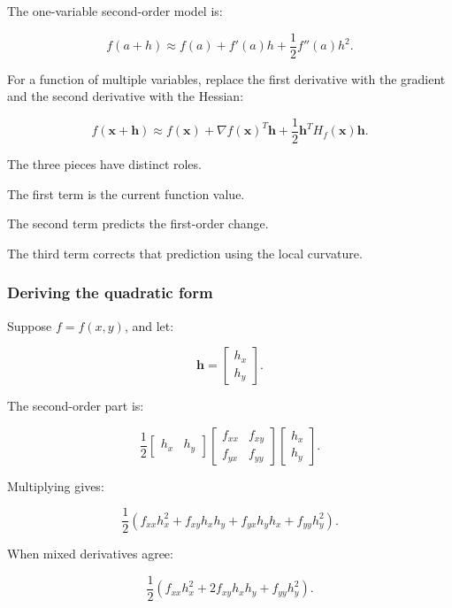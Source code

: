 \hypertarget{02-foundations-ii-ch021-multivariable-taylor-approximation}{}

The one-variable second-order model is:

\[
f(a+h) \approx f(a)+f'(a)h+\frac12f''(a)h^2.
\]

For a function of multiple variables, replace the first derivative with the gradient and the second derivative with the Hessian:

\[
\boxed{ f(\mathbf x+\mathbf h) \approx f(\mathbf x) + \nabla f(\mathbf x)^T\mathbf h + \frac12\mathbf h^TH_f(\mathbf x)\mathbf h }.
\]

The three pieces have distinct roles.

The first term is the current function value.

The second term predicts the first-order change.

The third term corrects that prediction using the local curvature.

\subsubsection{Deriving the quadratic form}\label{02-foundations-ii-ch021-deriving-the-quadratic-form}

\hypertarget{02-foundations-ii-ch021-deriving-the-quadratic-form}{}

Suppose \(f=f(x,y)\), and let:

\[
\mathbf h= \begin{bmatrix}h_x\\h_y\end{bmatrix}.
\]

The second-order part is:

\[
\frac12 \begin{bmatrix}h_x&h_y\end{bmatrix} \begin{bmatrix} f_{xx}&f_{xy}\\ f_{yx}&f_{yy} \end{bmatrix} \begin{bmatrix}h_x\\h_y\end{bmatrix}.
\]

Multiplying gives:

\[
\frac12\left( f_{xx}h_x^2+ f_{xy}h_xh_y+ f_{yx}h_yh_x+ f_{yy}h_y^2 \right).
\]

When mixed derivatives agree:

\[
\boxed{ \frac12\left( f_{xx}h_x^2+ 2f_{xy}h_xh_y+ f_{yy}h_y^2 \right) }.
\]


